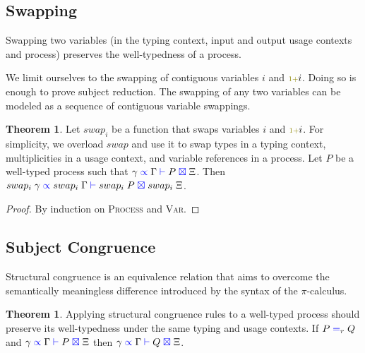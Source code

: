 \documentclass[a4paper,UKenglish,cleveref, autoref, thm-restate,authorcolumns]{lipics-v2019}
\theoremstyle{definition}
\newtheorem{nitheorem}[theorem]{Theorem}
\newcommand{\picalc}{$\pi$-calculus}
\newcommand{\type}[1]{\textcolor{blue}{\operatorname{#1}}}
\newcommand{\constr}[1]{\textcolor{olive}{\operatorname{#1}}}
\newcommand{\suc}{\constr{\scriptstyle 1+}}
\newcommand{\types}[4]{#1 \; \type{\propto} \; #2 \; \type{\vdash} \; #3 \; \type{\boxtimes} \; #4}
\newcommand{\eq}[1]{\; \type{=}_{#1} \;}
\begin{document}
\subsection{Swapping}
\label{swapping}

Swapping two variables (in the typing context, input and output usage contexts and process) preserves the well-typedness of a process.

\begin{remark}
  We limit ourselves to the swapping of contiguous variables $i$ and $\suc i$.
  Doing so is enough to prove subject reduction.
  The swapping of any two variables can be modeled as a sequence of contiguous variable swappings.
\end{remark}


\begin{nitheorem}
  \label{thm:swapping}
  Let $swap_i$ be a function that swaps variables $i$ and $\suc i$.
  For simplicity, we overload $swap$ and use it to swap types in a typing context, multiplicities in a usage context, and variable references in a process.
  Let $P$ be a well-typed process such that $\types{\gamma}{\Gamma}{P}{\Xi}$.
  Then $\types{swap_i \; \gamma}{swap_i \; \Gamma}{swap_i \; P}{swap_i \; \Xi}$.
\end{nitheorem}
\begin{proof}
  By induction on \textsc{Process} and \textsc{Var}.
\end{proof}

\subsection{Subject Congruence}
\label{subject-congruence}

Structural congruence is an equivalence relation that aims to overcome the semantically meaningless difference introduced by the syntax of the \picalc{}.

\begin{nitheorem}
  \label{thm:subject-congruence}
  Applying structural congruence rules to a well-typed process should preserve its well-typedness under the same typing and usage contexts.
  If $P \eq{r} Q$ and $\types{\gamma}{\Gamma}{P}{\Xi}$ then $\types{\gamma}{\Gamma}{Q}{\Xi}$.
\end{nitheorem}
\end{document}
